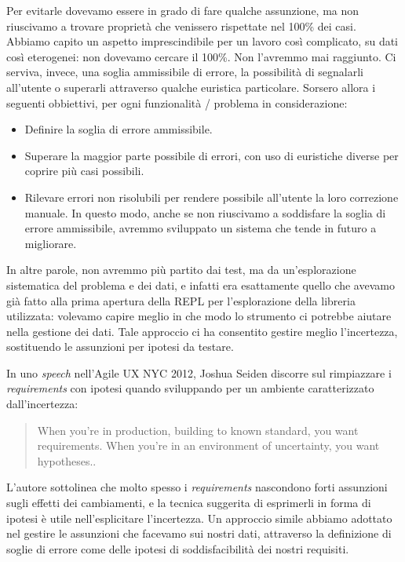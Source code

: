 \documentclass[12pt]{report}
\begin{document}
Per evitarle dovevamo essere in grado di fare qualche assunzione, ma
non riuscivamo a trovare proprietà che venissero rispettate nel 100\%
dei casi. Abbiamo capito un aspetto imprescindibile per un lavoro così
complicato, su dati così eterogenei: non dovevamo cercare il 100\%.
Non l'avremmo mai raggiunto. Ci serviva, invece, una soglia ammissibile di
errore, la possibilità di segnalarli all'utente o superarli attraverso qualche
euristica particolare. Sorsero allora i seguenti obbiettivi, per ogni
funzionalità / problema in considerazione: 

\begin{itemize}
  \item Definire la soglia di errore ammissibile.
  \item Superare la maggior parte possibile di errori, con uso di
euristiche diverse per coprire più casi possibili.
  \item Rilevare errori non risolubili per rendere possibile
all'utente la loro correzione manuale. In questo modo, anche se non
riuscivamo a soddisfare la soglia di errore ammissibile, avremmo
sviluppato un sistema che tende in futuro a migliorare.
\end{itemize}

In altre parole, non avremmo più partito dai test, ma da un'esplorazione
sistematica del problema e dei dati, e infatti era esattamente quello che
avevamo già fatto alla prima apertura della REPL per l'esplorazione della
libreria utilizzata: volevamo capire meglio in che modo lo strumento ci
potrebbe aiutare nella gestione dei dati. Tale approccio ci ha consentito
gestire meglio l'incertezza, sostituendo le assunzioni per ipotesi da testare.

In uno \textit{speech} nell'Agile UX NYC 2012, Joshua Seiden discorre
sul rimpiazzare i \textit{requirements} con ipotesi quando sviluppando
per un ambiente caratterizzato dall'incertezza: 

\begin{quote}
When you're in production, building to known standard, you want requirements. 
When you're in an environment of uncertainty, you want hypotheses.\cite{seiden2012}.
\end{quote}

L'autore sottolinea che molto spesso i \textit{requirements}
nascondono forti assunzioni sugli effetti dei cambiamenti, e la
tecnica suggerita di esprimerli in forma di ipotesi è utile nell'esplicitare
l'incertezza. Un approccio simile abbiamo adottato nel gestire le assunzioni
che facevamo sui nostri dati, attraverso la definizione di soglie di errore
come delle ipotesi di soddisfacibilità dei nostri requisiti.
\end{document}
